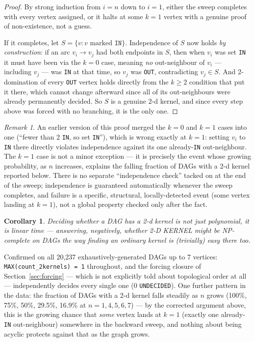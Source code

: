 \documentclass[11pt]{article}
\theoremstyle{plain}
\newtheorem{corollary}[theorem]{Corollary}
\theoremstyle{definition}
\theoremstyle{remark}
\newtheorem*{remark}{Remark}
\begin{document}
\begin{proof}
By strong induction from $i=n$ down to $i=1$, either the sweep completes with every
vertex assigned, or it halts at some $k=1$ vertex with a genuine proof of
non-existence, not a guess.

If it completes, let $S = \{v : v \text{ marked } \texttt{IN}\}$. Independence of $S$
now holds \emph{by construction}: if an arc $v_i \to v_j$ had both endpoints in $S$,
then when $v_i$ was set \texttt{IN} it must have been via the $k=0$ case, meaning
\emph{no} out-neighbour of $v_i$ — including $v_j$ — was \texttt{IN} at that time, so
$v_j$ was \texttt{OUT}, contradicting $v_j \in S$. And 2-domination of every
\texttt{OUT} vertex holds directly from the $k \ge 2$ condition that put it there,
which cannot change afterward since all of its out-neighbours were already
permanently decided. So $S$ is a genuine 2-d kernel, and since every step above was
forced with no branching, it is the only one.
\end{proof}

\begin{remark}
An earlier version of this proof merged the $k=0$ and $k=1$ cases into one (``fewer
than 2 \texttt{IN}, so set \texttt{IN}''), which is wrong exactly at $k=1$: setting
$v_i$ to \texttt{IN} there directly violates independence against its one already-\texttt{IN}
out-neighbour. The $k=1$ case is not a minor exception — it is precisely the
event whose growing probability, as $n$ increases, explains the falling fraction of
DAGs with a 2-d kernel reported below. There is no separate ``independence check''
tacked on at the end of the sweep; independence is guaranteed automatically whenever
the sweep completes, and failure is a specific, structural, locally-detected event
(some vertex landing at $k=1$), not a global property checked only after the fact.
\end{remark}


\begin{corollary}
Deciding whether a DAG has a 2-d kernel is not just polynomial, it is linear time —
answering, negatively, whether 2-D KERNEL might be NP-complete on DAGs the way finding
an ordinary kernel is (trivially) easy there too.
\end{corollary}

Confirmed on all 20{,}237 exhaustively-generated DAGs up to 7 vertices:
\texttt{MAX(count\_2kernels) = 1} throughout, and the forcing closure of
Section~\ref{sec:forcing} — which is not explicitly told about topological order at
all — independently decides every single one (0 \texttt{UNDECIDED}). One further
pattern in the data: the fraction of DAGs with a 2-d kernel falls steadily as $n$ grows
(100\%, 75\%, 50\%, 29.5\%, 16.9\% at $n = 1,4,5,6,7$) — by the corrected argument
above, this is the growing chance that \emph{some} vertex lands at $k=1$ (exactly one
already-\texttt{IN} out-neighbour) somewhere in the backward sweep, and nothing about
being acyclic protects against that as the graph grows.
\end{document}
